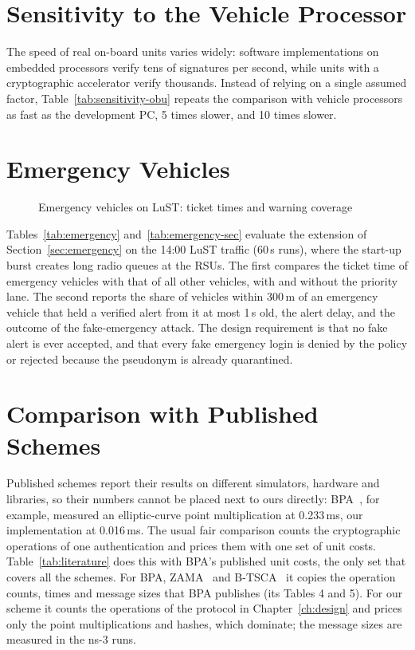 \section{Sensitivity to the Vehicle Processor}\label{sec:res-sens}


The speed of real on-board units varies widely: software implementations on embedded processors
verify tens of signatures per second, while units with a cryptographic accelerator verify thousands.
Instead of relying on a single assumed factor, Table~\ref{tab:sensitivity-obu} repeats the comparison
with vehicle processors as fast as the development PC, 5 times slower, and 10 times slower.

\section{Emergency Vehicles}\label{sec:res-emergency}


\begin{figure}[htbp]\centering
{}
\caption{Emergency vehicles on LuST: ticket times and warning coverage}\label{fig:emergency}
\end{figure}

Tables~\ref{tab:emergency} and~\ref{tab:emergency-sec} evaluate the extension of Section~\ref{sec:emergency} on the 14:00 LuST
traffic (60\,s runs), where
the start-up burst creates long radio queues at the RSUs. The first compares the ticket time of emergency vehicles with
that of all other vehicles, with and without the priority lane. The second reports the share of vehicles
within 300\,m of an emergency vehicle that held a verified alert from it at most 1\,s old, the alert
delay, and the outcome of the fake-emergency attack. The design requirement is that no fake alert is
ever accepted, and that every fake emergency login is denied by the policy or rejected because the
pseudonym is already quarantined.

\section{Comparison with Published Schemes}\label{sec:res-literature}

Published schemes report their results on different simulators, hardware and libraries, so their
numbers cannot be placed next to ours directly: BPA~\cite{li2024bpa}, for example, measured an
elliptic-curve point multiplication at 0.233\,ms, our implementation at 0.016\,ms. The usual fair
comparison counts the cryptographic operations of one authentication and prices them with one set
of unit costs. Table~\ref{tab:literature} does this with BPA's published unit costs, the only set
that covers all the schemes. For BPA, ZAMA~\cite{xi2022zama} and B-TSCA~\cite{wang2021btsca} it
copies the operation counts, times and message sizes that BPA publishes (its Tables 4 and 5). For
our scheme it counts the operations of the protocol in Chapter~\ref{ch:design} and prices only the
point multiplications and hashes, which dominate; the message sizes are measured in the ns-3 runs.

